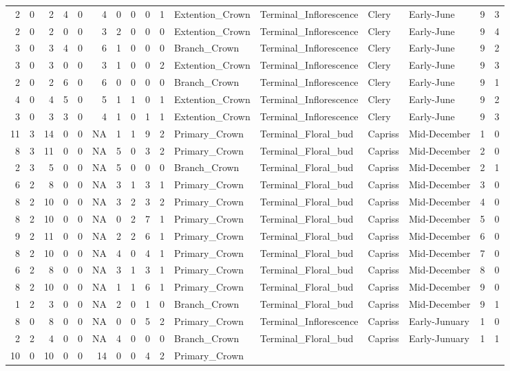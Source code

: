\documentclass[]{article}
\begin{document}
\begin{longtable}[]{@{}rrrrrrrrrrllllrl@{}}
2 & 0 & 2 & 4 & 0 & 4 & 0 & 0 & 0 & 1 & Extention\_Crown &
Terminal\_Inflorescence & Clery & Early-June & 9 & 3\tabularnewline
2 & 0 & 2 & 0 & 0 & 3 & 2 & 0 & 0 & 0 & Extention\_Crown &
Terminal\_Inflorescence & Clery & Early-June & 9 & 4\tabularnewline
3 & 0 & 3 & 4 & 0 & 6 & 1 & 0 & 0 & 0 & Branch\_Crown &
Terminal\_Inflorescence & Clery & Early-June & 9 & 2\tabularnewline
3 & 0 & 3 & 0 & 0 & 3 & 1 & 0 & 0 & 2 & Extention\_Crown &
Terminal\_Inflorescence & Clery & Early-June & 9 & 3\tabularnewline
2 & 0 & 2 & 6 & 0 & 6 & 0 & 0 & 0 & 0 & Branch\_Crown &
Terminal\_Inflorescence & Clery & Early-June & 9 & 1\tabularnewline
4 & 0 & 4 & 5 & 0 & 5 & 1 & 1 & 0 & 1 & Extention\_Crown &
Terminal\_Inflorescence & Clery & Early-June & 9 & 2\tabularnewline
3 & 0 & 3 & 3 & 0 & 4 & 1 & 0 & 1 & 1 & Extention\_Crown &
Terminal\_Inflorescence & Clery & Early-June & 9 & 3\tabularnewline
11 & 3 & 14 & 0 & 0 & NA & 1 & 1 & 9 & 2 & Primary\_Crown &
Terminal\_Floral\_bud & Capriss & Mid-December & 1 & 0\tabularnewline
8 & 3 & 11 & 0 & 0 & NA & 5 & 0 & 3 & 2 & Primary\_Crown &
Terminal\_Floral\_bud & Capriss & Mid-December & 2 & 0\tabularnewline
2 & 3 & 5 & 0 & 0 & NA & 5 & 0 & 0 & 0 & Branch\_Crown &
Terminal\_Floral\_bud & Capriss & Mid-December & 2 & 1\tabularnewline
6 & 2 & 8 & 0 & 0 & NA & 3 & 1 & 3 & 1 & Primary\_Crown &
Terminal\_Floral\_bud & Capriss & Mid-December & 3 & 0\tabularnewline
8 & 2 & 10 & 0 & 0 & NA & 3 & 2 & 3 & 2 & Primary\_Crown &
Terminal\_Floral\_bud & Capriss & Mid-December & 4 & 0\tabularnewline
8 & 2 & 10 & 0 & 0 & NA & 0 & 2 & 7 & 1 & Primary\_Crown &
Terminal\_Floral\_bud & Capriss & Mid-December & 5 & 0\tabularnewline
9 & 2 & 11 & 0 & 0 & NA & 2 & 2 & 6 & 1 & Primary\_Crown &
Terminal\_Floral\_bud & Capriss & Mid-December & 6 & 0\tabularnewline
8 & 2 & 10 & 0 & 0 & NA & 4 & 0 & 4 & 1 & Primary\_Crown &
Terminal\_Floral\_bud & Capriss & Mid-December & 7 & 0\tabularnewline
6 & 2 & 8 & 0 & 0 & NA & 3 & 1 & 3 & 1 & Primary\_Crown &
Terminal\_Floral\_bud & Capriss & Mid-December & 8 & 0\tabularnewline
8 & 2 & 10 & 0 & 0 & NA & 1 & 1 & 6 & 1 & Primary\_Crown &
Terminal\_Floral\_bud & Capriss & Mid-December & 9 & 0\tabularnewline
1 & 2 & 3 & 0 & 0 & NA & 2 & 0 & 1 & 0 & Branch\_Crown &
Terminal\_Floral\_bud & Capriss & Mid-December & 9 & 1\tabularnewline
8 & 0 & 8 & 0 & 0 & NA & 0 & 0 & 5 & 2 & Primary\_Crown &
Terminal\_Inflorescence & Capriss & Early-Junuary & 1 & 0\tabularnewline
2 & 2 & 4 & 0 & 0 & NA & 4 & 0 & 0 & 0 & Branch\_Crown &
Terminal\_Floral\_bud & Capriss & Early-Junuary & 1 & 1\tabularnewline
10 & 0 & 10 & 0 & 0 & 14 & 0 & 0 & 4 & 2 & Primary\_Crown &

\end{longtable}
\end{document}
